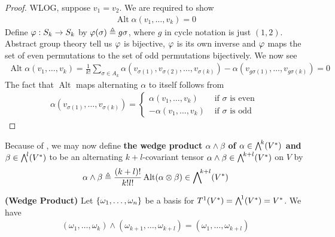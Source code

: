 \documentclass{report}
\begin{document}
\begin{proof}
WLOG, suppose $v_1=v_2$.  We are required to show 
\begin{align*}
\operatorname{Alt}\alpha (v_1,\dots,v_k)=0
\end{align*}
Define $\pfi:S_k\rightarrow S_k$ by $\pfi(\sigma)\triangleq g \sigma$, where $g$ in cycle notation is just  $(1,2)$. Abstract group theory tell us $\pfi$ is bijective, $\pfi$ is its own inverse and $\pfi$ maps the set of even permutations to the set of odd permutations bijectively. We now see 
\begin{align*}
\operatorname{Alt}\alpha (v_1,\dots ,v_k)= \frac{1}{k!}\sum_{\sigma \in A_k}\alpha (v_{\sigma (1)},v_{\sigma (2)},\dots ,v_{\sigma (k)}) - \alpha (v_{g\sigma (1)},\dots ,v_{g \sigma(k)})=0 
\end{align*}
The fact that $\operatorname{Alt}$ maps alternating $\alpha $ to itself follows from 
\begin{align*}
\alpha (v_{\sigma (1)},\dots ,v_{\sigma (k)})=\begin{cases}
  \alpha (v_1,\dots, v_k)& \text{ if $\sigma$ is even }\\
  -\alpha (v_1,\dots ,v_k)& \text{ if $\sigma$ is odd }
\end{cases}
\end{align*}
\end{proof}
\begin{mdframed}
Because of , we may now define \textbf{the wedge product $\alpha \wedge  \beta  $ of $\alpha  \in \extp^k(V^*)$ and $\beta \in \extp^l(V^*)$} to be an alternating $k+l$-covariant tensor $\alpha \wedge  \beta  \in \extp^{k+l}(V^*)$ on $V$ by 
\begin{align*}
\alpha \wedge  \beta \triangleq \frac{(k+l)!}{k!l!}\operatorname{Alt}(\alpha \otimes \beta ) \in \extp^{k+l}(V^*) 
\end{align*}
\end{mdframed}
\begin{theorem}
\label{WP}
\textbf{(Wedge Product)} Let $\{ \omega_1,\dots ,\omega_n \}$ be a basis for $T^1(V^*)=\extp^1 (V^*)=V^*$. We have 
\begin{align*}
  (\omega_1 ,\dots ,\omega_k)\wedge  (\omega_{k+1},\dots, \omega_{k+l})=(\omega_1,\dots ,\omega_{k+l}) 
\end{align*}
\end{theorem}
\end{document}

